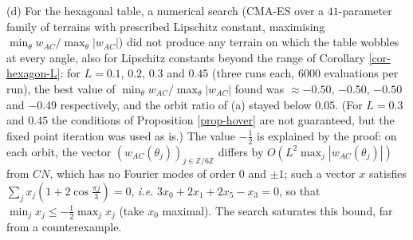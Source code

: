 \documentclass[a4paper,11pt,twoside,leqno]{article}
\newcommand{\ie}[0]{\emph{i.e.} }
\newcommand{\zz}[0]{\ensuremath{\mathbb{Z}}}
\numberwithin{equation}{section}
\begin{document}
\begin{rmk}
(d) For the hexagonal table, a numerical search (CMA-ES over a $41$-parameter family of terrains with prescribed Lipschitz constant, maximising $\min_\theta w_{AC}/\max_\theta |w_{AC}|$) did not produce any terrain on which the table wobbles at every angle, also for Lipschitz constants beyond the range of Corollary \ref{cor-hexagon-L}: for $L = 0.1$, $0.2$, $0.3$ and $0.45$ (three runs each, $6000$ evaluations per run), the best value of $\min_\theta w_{AC}/\max_\theta|w_{AC}|$ found was $\approx -0.50$, $-0.50$, $-0.50$ and $-0.49$ respectively, and the orbit ratio of (a) stayed below $0.05$. (For $L = 0.3$ and $0.45$ the conditions of Proposition \ref{prop-hover} are not guaranteed, but the fixed point iteration was used as is.) The value $-\frac{1}{2}$ is explained by the proof: on each orbit, the vector $(w_{AC}(\theta_j))_{j \in \zz/6\zz}$ differs by $O(L^2 \max_j |w_{AC}(\theta_j)|)$ from $CN$, which has no Fourier modes of order $0$ and $\pm 1$; such a vector $x$ satisfies $\sum_j x_j (1 + 2\cos\frac{\pi j}{3}) = 0$, \ie $3x_0 + 2x_1 + 2x_5 - x_3 = 0$, so that $\min_j x_j \leq -\frac{1}{2} \max_j x_j$ (take $x_0$ maximal). The search saturates this bound, far from a counterexample.
\end{rmk}
\end{document}
